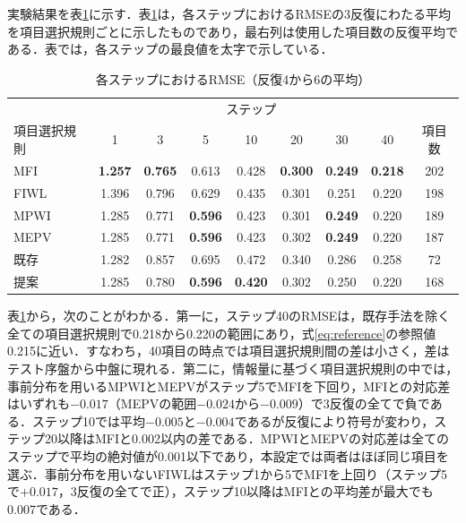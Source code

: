 \documentclass[paper]{ieicej}
\begin{document}
実験結果を表\ref{tab:main}に示す．表\ref{tab:main}は，各ステップにおけるRMSEの3反復にわたる平均を項目選択規則ごとに示したものであり，最右列は使用した項目数の反復平均である．表では，各ステップの最良値を太字で示している．

\begin{table}[t]
\centering
\caption{各ステップにおけるRMSE（反復4から6の平均）}
\label{tab:main}
\footnotesize
\setlength{\tabcolsep}{2pt}
\begin{tabular}{lcccccccc}
\hline
 & \multicolumn{7}{c}{ステップ} & \\
項目選択規則 & 1 & 3 & 5 & 10 & 20 & 30 & 40 & 項目数\\
\hline
MFI & \textbf{1.257} & \textbf{0.765} & 0.613 & 0.428 & \textbf{0.300} & \textbf{0.249} & \textbf{0.218} & 202\\
FIWL & 1.396 & 0.796 & 0.629 & 0.435 & 0.301 & 0.251 & 0.220 & 198\\
MPWI & 1.285 & 0.771 & \textbf{0.596} & 0.423 & 0.301 & \textbf{0.249} & 0.220 & 189\\
MEPV & 1.285 & 0.771 & \textbf{0.596} & 0.423 & 0.302 & \textbf{0.249} & 0.220 & 187\\
既存 & 1.282 & 0.857 & 0.695 & 0.472 & 0.340 & 0.286 & 0.258 & 72\\
提案 & 1.285 & 0.780 & \textbf{0.596} & \textbf{0.420} & 0.302 & 0.250 & 0.220 & 168\\
\hline
\end{tabular}
\end{table}

表\ref{tab:main}から，次のことがわかる．第一に，ステップ40のRMSEは，既存手法を除く全ての項目選択規則で0.218から0.220の範囲にあり，式\eqref{eq:reference}の参照値0.215に近い．すなわち，40項目の時点では項目選択規則間の差は小さく，差はテスト序盤から中盤に現れる．第二に，情報量に基づく項目選択規則の中では，事前分布を用いるMPWIとMEPVがステップ5でMFIを下回り，MFIとの対応差はいずれも$-0.017$（MEPVの範囲$-0.024$から$-0.009$）で3反復の全てで負である．ステップ10では平均$-0.005$と$-0.004$であるが反復により符号が変わり，ステップ20以降はMFIと0.002以内の差である．MPWIとMEPVの対応差は全てのステップで平均の絶対値が0.001以下であり，本設定では両者はほぼ同じ項目を選ぶ．事前分布を用いないFIWLはステップ1から5でMFIを上回り（ステップ5で$+0.017$，3反復の全てで正），ステップ10以降はMFIとの平均差が最大でも0.007である．
\end{document}
